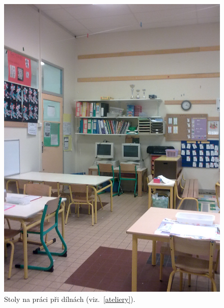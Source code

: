 	\begin{figure}[tb]
		\centering
		\includegraphics[height=0.35\textheight]{./fotky/Obr13.jpg}
		\caption{
			Stoly na práci při dílnách (viz.~\ref{ateliery}).
		}
		\label{Obr13}
	\end{figure}
